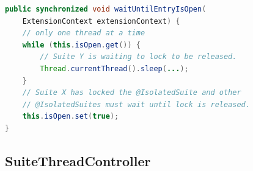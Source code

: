 \begin{lstlisting}[language=Java,label=isolatedsuite:sync,caption=Implementation of the @IsolatedSuite synchronisation mechanism,frame=tb]
public synchronized void waitUntilEntryIsOpen(
    ExtensionContext extensionContext) {
    // only one thread at a time
    while (this.isOpen.get()) {
        // Suite Y is waiting to lock to be released.
        Thread.currentThread().sleep(...);
    }
    // Suite X has locked the @IsolatedSuite and other
    // @IsolatedSuites must wait until lock is released.
    this.isOpen.set(true);
}
\end{lstlisting}

\subsection{SuiteThreadController}
\label{05:class:wide:suite:thread:controller}

